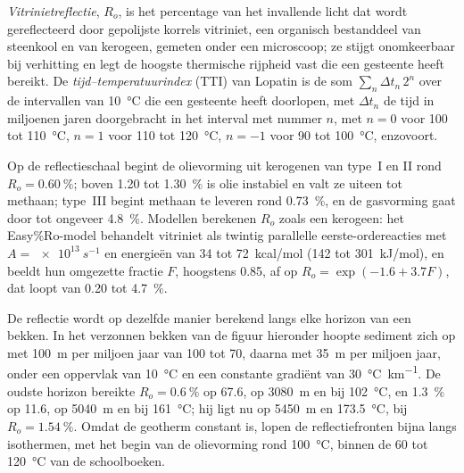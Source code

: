 \begin{definition}\label{def:b2:energy-geology:maturity}
\emph{Vitrinietreflectie}, $R_o$, is het percentage van het invallende
licht dat wordt gereflecteerd door gepolijste korrels vitriniet, een organisch bestanddeel van steenkool en van kerogeen,
gemeten onder een microscoop; ze stijgt onomkeerbaar bij verhitting en legt de hoogste thermische rijpheid vast die een gesteente heeft bereikt. De
\emph{tijd--temperatuurindex} (TTI) van Lopatin is de som
$\sum_n \Delta t_n\,2^n$ over de intervallen van \qty{10}{\celsius} die een gesteente heeft doorlopen,
met $\Delta t_n$ de tijd in miljoenen jaren doorgebracht in het interval met nummer $n$, met $n = 0$
voor 100 tot \qty{110}{\celsius}, $n = 1$ voor 110 tot \qty{120}{\celsius}, $n = -1$ voor 90 tot
\qty{100}{\celsius}, enzovoort.
\end{definition}

Op de reflectieschaal begint de olievorming uit kerogenen van type~I en II rond $R_o =
\qty{0.60}{\percent}$; boven 1.20 tot \qty{1.30}{\percent} is olie instabiel en valt ze uiteen tot
methaan; type~III begint methaan te leveren rond \qty{0.73}{\percent}, en de gasvorming gaat door tot
ongeveer \qty{4.8}{\percent}. Modellen berekenen $R_o$ zoals een kerogeen: het Easy\%Ro-model
behandelt vitriniet als twintig parallelle eerste-ordereacties met $A = \qty{e13}{s^{-1}}$ en energieën
van 34 tot \qty{72}{kcal/mol} (142 tot \qty{301}{kJ/mol}), en beeldt hun omgezette fractie $F$,
hoogstens 0.85, af op $R_o = \exp(-1.6 + 3.7F)$, dat loopt van 0.20 tot \qty{4.7}{\percent}.

De reflectie wordt op dezelfde manier berekend langs elke horizon van een bekken. In het verzonnen bekken van de
figuur hieronder hoopte sediment zich op met \qty{100}{m} per miljoen jaar van 100 tot \qty{70}{\Ma},
daarna met \qty{35}{m} per miljoen jaar, onder een oppervlak van \qty{10}{\celsius} en een constante gradiënt
van \qty{30}{\celsius\per\km}. De oudste horizon bereikte $R_o = \qty{0.6}{\percent}$ op
\qty{67.6}{\Ma}, op \qty{3080}{m} en bij \qty{102}{\celsius}, en \qty{1.3}{\percent} op
\qty{11.6}{\Ma}, op \qty{5040}{m} en bij \qty{161}{\celsius}; hij ligt nu op \qty{5450}{m} en
\qty{173.5}{\celsius}, bij $R_o = \qty{1.54}{\percent}$. Omdat de geotherm constant is, lopen de
reflectiefronten bijna langs isothermen, met het begin van de olievorming rond
\qty{100}{\celsius}, binnen de 60 tot \qty{120}{\celsius} van de schoolboeken.

